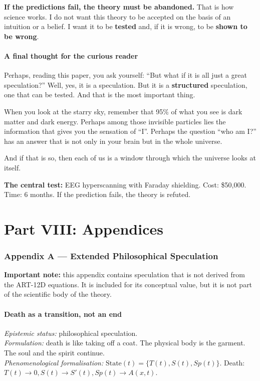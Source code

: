 \documentclass[11pt,a4paper]{article}
\begin{document}
\textbf{If the predictions fail, the theory must be abandoned.} That is how science works. I do not want this theory to be accepted on the basis of an intuition or a belief. I want it to be \textbf{tested} and, if it is wrong, to be \textbf{shown to be wrong}.

\subsection{A final thought for the curious reader}
Perhaps, reading this paper, you ask yourself: ``But what if it is all just a great speculation?'' Well, yes, it is a speculation. But it is a \textbf{structured} speculation, one that can be tested. And that is the most important thing.

When you look at the starry sky, remember that 95\% of what you see is dark matter and dark energy. Perhaps among those invisible particles lies the information that gives you the sensation of ``I''. Perhaps the question ``who am I?'' has an answer that is not only in your brain but in the whole universe.

And if that is so, then each of us is a window through which the universe looks at itself.

\textbf{The central test:} EEG hyperscanning with Faraday shielding. Cost: \$50,000. Time: 6 months. If the prediction fails, the theory is refuted.

\newpage
\part*{Part VIII: Appendices}

\section{Appendix A --- Extended Philosophical Speculation}
\textbf{Important note:} this appendix contains speculation that is not derived from the ART-12D equations. It is included for its conceptual value, but it is not part of the scientific body of the theory.

\subsection{Death as a transition, not an end}
\textit{Epistemic status:} philosophical speculation. \\
\textit{Formulation:} death is like taking off a coat. The physical body is the garment. The soul and the spirit continue. \\
\textit{Phenomenological formalisation:} $\text{State}(t) = \{ T(t), S(t), Sp(t) \}$. Death: $T(t) \to 0, S(t) \to S'(t), Sp(t) \to A(x,t)$.
\end{document}
